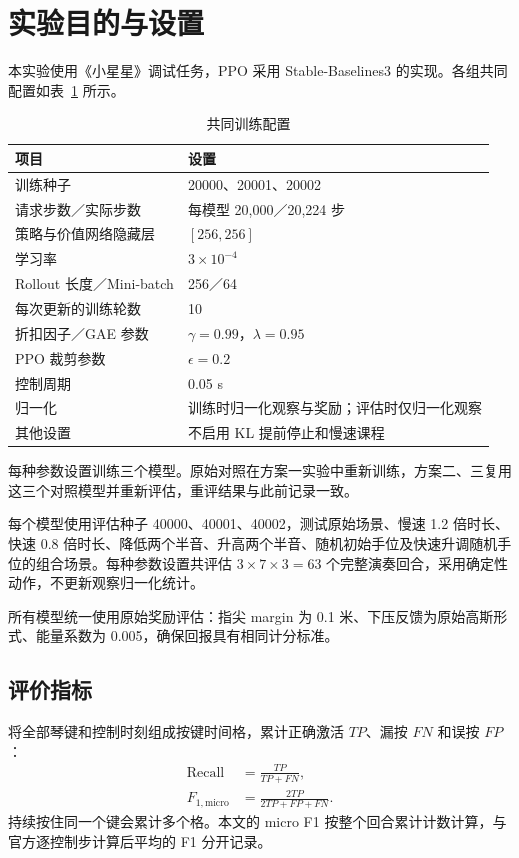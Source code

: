 \documentclass[UTF8,a4paper,11pt]{ctexart}
\begin{document}
\section{实验目的与设置}

本实验使用《小星星》调试任务，PPO 采用 Stable-Baselines3 的实现。各组共同配置如表~\ref{tab:config} 所示。

\begin{table}[H]
\centering
\caption{共同训练配置}
\label{tab:config}
\begin{tabularx}{\textwidth}{@{}lX@{}}
\toprule
项目 & 设置 \\
\midrule
训练种子 & 20000、20001、20002 \\
请求步数／实际步数 & 每模型 20,000／20,224 步 \\
策略与价值网络隐藏层 & $[256,256]$ \\
学习率 & $3\times10^{-4}$ \\
Rollout 长度／Mini-batch & 256／64 \\
每次更新的训练轮数 & 10 \\
折扣因子／GAE 参数 & $\gamma=0.99$，$\lambda=0.95$ \\
PPO 裁剪参数 & $\epsilon=0.2$ \\
控制周期 & 0.05 s \\
归一化 & 训练时归一化观察与奖励；评估时仅归一化观察 \\
其他设置 & 不启用 KL 提前停止和慢速课程 \\
\bottomrule
\end{tabularx}
\end{table}

每种参数设置训练三个模型。原始对照在方案一实验中重新训练，方案二、三复用这三个对照模型并重新评估，重评结果与此前记录一致。

每个模型使用评估种子 40000、40001、40002，测试原始场景、慢速 1.2 倍时长、快速 0.8 倍时长、降低两个半音、升高两个半音、随机初始手位及快速升调随机手位的组合场景。每种参数设置共评估 $3\times7\times3=63$ 个完整演奏回合，采用确定性动作，不更新观察归一化统计。

所有模型统一使用原始奖励评估：指尖 margin 为 0.1 米、下压反馈为原始高斯形式、能量系数为 0.005，确保回报具有相同计分标准。

\subsection{评价指标}

将全部琴键和控制时刻组成按键时间格，累计正确激活 $TP$、漏按 $FN$ 和误按 $FP$：
\begin{align}
\mathrm{Recall} &= \frac{TP}{TP+FN},\\
F_{1,\mathrm{micro}} &= \frac{2TP}{2TP+FP+FN}.
\end{align}
持续按住同一个键会累计多个格。本文的 micro F1 按整个回合累计计数计算，与官方逐控制步计算后平均的 F1 分开记录。
\end{document}
